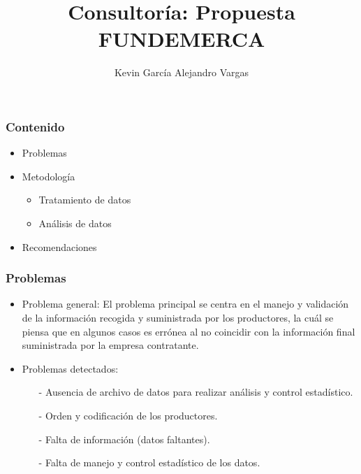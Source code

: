 \documentclass[11pt]{beamer}
\author[Kevin García - Alejandro Vargas]{Kevin García \newline Alejandro Vargas }
\title[Consultoría]{Consultoría: Propuesta FUNDEMERCA}
\begin{document}
\justifying


\begin{frame}
\titlepage
\end{frame}


\begin{frame}
\frametitle{Contenido}
\begin{itemize}
\item Problemas
\item Metodología
\begin{itemize}
\item Tratamiento de datos
\item Análisis de datos
\end{itemize}
\item Recomendaciones
\end{itemize}
\end{frame}

\begin{frame}
\frametitle{Problemas}
\begin{itemize}
\justifying
\item Problema general: El problema principal se centra en el manejo y validación de la información recogida y suministrada por los productores, la cuál se piensa que en algunos casos es errónea al no coincidir con la información final suministrada por la empresa contratante.
\item Problemas detectados: 
\begin{itemize}
\item[-]Ausencia de archivo de datos para realizar análisis y control estadístico.
\item[-]Orden y codificación de los productores.
\item[-]Falta de información (datos faltantes).
\item[-]Falta de manejo y control estadístico de los datos.
\end{itemize}
\end{itemize}
\end{frame}
\end{document}
